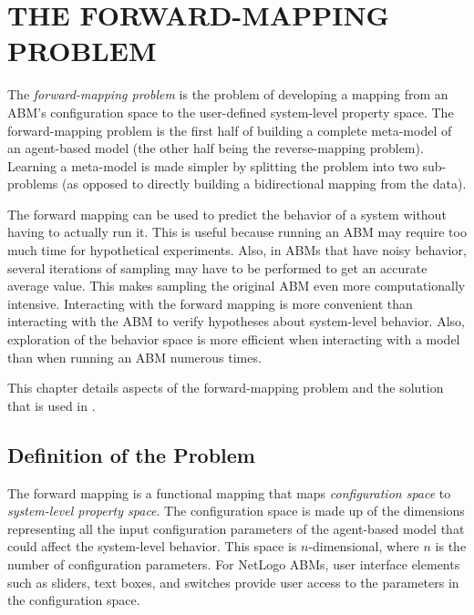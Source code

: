 \chapter{THE FORWARD-MAPPING PROBLEM}
\thispagestyle{plain}

\label{ForwardMapping}

The \textit{forward-mapping problem} is the problem of developing a mapping from an ABM's configuration space to the user-defined system-level property space.
The forward-mapping problem is the first half of building a complete meta-model of an agent-based model (the other half being the reverse-mapping problem).
Learning a meta-model is made simpler by splitting the problem into two sub-problems (as opposed to directly building a bidirectional mapping from the data).

The forward mapping can be used to predict the behavior of a system without having to actually run it.
This is useful because running an ABM may require too much time for hypothetical experiments.
Also, in ABMs that have noisy behavior, several iterations of sampling may have to be performed to get an accurate average value.
This makes sampling the original ABM even more computationally intensive.
Interacting with the forward mapping is more convenient than interacting with the ABM to verify hypotheses about system-level behavior.
Also, exploration of the behavior space is more efficient when interacting with a model than when running an ABM numerous times.


This chapter details aspects of the forward-mapping problem and the solution that is used in \fw.

\section{Definition of the Problem}
The forward mapping is a functional mapping that maps \textit{configuration space} to \textit{system-level property space}.
The configuration space is made up of the dimensions representing all the input configuration parameters of the agent-based model that could affect the system-level behavior.
This space is $n$-dimensional, where $n$ is the number of configuration parameters.
For NetLogo ABMs, user interface elements such as sliders, text boxes, and switches provide user access to the parameters in the configuration space.

